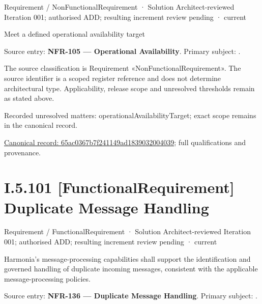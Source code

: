 \label{element:65ac0367b7f241149ad1839032004039}
{\small Requirement / NonFunctionalRequirement · Solution Architect-reviewed Iteration 001; authorised ADD; resulting increment review pending · current}\par

Meet a defined operational availability target



Source entry: \textbf{NFR-105 — Operational Availability}. Primary subject: \texttt{}.



The source classification is Requirement «NonFunctionalRequirement». The source identifier is a scoped register reference and does not determine architectural type. Applicability, release scope and unresolved thresholds remain as stated above.


{\small Recorded unresolved matters: operationalAvailabilityTarget; exact scope remains in the canonical record.}\par
{\footnotesize \href{../../../../../../../../continuum/motivation/requirement/non-functional-requirement/65ac0367b7f241149ad1839032004039.md}{Canonical record: 65ac0367b7f241149ad1839032004039}; full qualifications and provenance.}\par
\section*{I.5.101 [FunctionalRequirement] Duplicate Message Handling}
\label{navigation:I.5.101}

\label{element:76a67526fcdf40999f375a8cac54d5ef}
{\small Requirement / FunctionalRequirement · Solution Architect-reviewed Iteration 001; authorised ADD; resulting increment review pending · current}\par

Harmonia's message-processing capabilities shall support the identification and governed handling of duplicate incoming messages, consistent with the applicable message-processing policies.



Source entry: \textbf{NFR-136 — Duplicate Message Handling}. Primary subject: \texttt{}.



